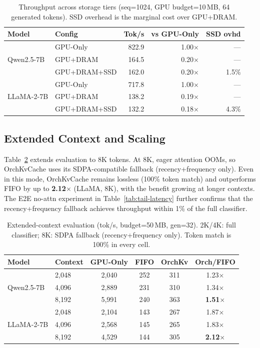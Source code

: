 \documentclass[conference]{IEEEtran}
\begin{document}
\begin{table}[t]
\centering
\caption{Throughput across storage tiers (seq=1024, GPU budget=10\,MB, 64 generated tokens). SSD overhead is the marginal cost over GPU+DRAM.}
\label{tab:tier-throughput}
\footnotesize
\setlength{\tabcolsep}{4pt}
\begin{tabular}{@{}llrrr@{}}
\toprule
Model & Config & Tok/s & vs GPU-Only & SSD ovhd \\
\midrule
\multirow{3}{*}{Qwen2.5-7B}
& GPU-Only     & 822.9 & 1.00$\times$ & --- \\
& GPU+DRAM     & 164.5 & 0.20$\times$ & --- \\
& GPU+DRAM+SSD & 162.0 & 0.20$\times$ & 1.5\% \\
\midrule
\multirow{3}{*}{LLaMA-2-7B}
& GPU-Only     & 717.8 & 1.00$\times$ & --- \\
& GPU+DRAM     & 138.2 & 0.19$\times$ & --- \\
& GPU+DRAM+SSD & 132.2 & 0.18$\times$ & 4.3\% \\
\bottomrule
\end{tabular}
\end{table}

\subsection{Extended Context and Scaling}
\label{sec:scale}

Table~\ref{tab:scale} extends evaluation to 8K tokens. At 8K, eager attention OOMs, so OrchKvCache uses its SDPA-compatible fallback (recency+frequency only). Even in this mode, OrchKvCache remains lossless (100\% token match) and outperforms FIFO by up to \textbf{2.12$\times$} (LLaMA, 8K), with the benefit growing at longer contexts. The E2E no-attn experiment in Table~\ref{tab:tail-latency} further confirms that the recency+frequency fallback achieves throughput within 1\% of the full classifier.

\begin{table}[t]
\centering
\caption{Extended-context evaluation (tok/s, budget=50\,MB, gen=32). 2K/4K: full classifier; 8K: SDPA fallback (recency+frequency only). Token match is 100\% in every cell.}
\label{tab:scale}
\small
\begin{tabular}{@{}llcccc@{}}
\toprule
Model & Context & GPU-Only & FIFO & OrchKv & Orch/FIFO \\
\midrule
\multirow{3}{*}{Qwen2.5-7B}
& 2{,}048  & 2{,}040 & 252  & 311  & 1.23$\times$ \\
& 4{,}096  & 2{,}889 & 231  & 310  & 1.34$\times$ \\
& 8{,}192  & 5{,}991 & 240  & 363  & \textbf{1.51$\times$} \\
\midrule
\multirow{3}{*}{LLaMA-2-7B}
& 2{,}048  & 2{,}104 & 143  & 267  & 1.87$\times$ \\
& 4{,}096  & 2{,}568 & 145  & 265  & 1.83$\times$ \\
& 8{,}192  & 4{,}529 & 144  & 305  & \textbf{2.12$\times$} \\
\bottomrule
\end{tabular}
\end{table}
\end{document}

